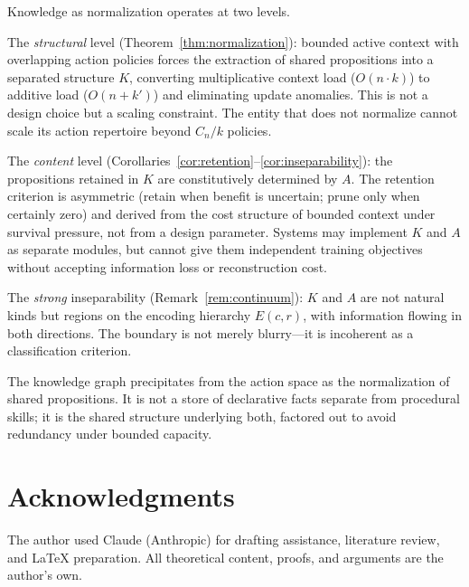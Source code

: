 \documentclass[11pt]{article}
\theoremstyle{definition}
\theoremstyle{remark}
\begin{document}
Knowledge as normalization operates at two levels.

The \emph{structural} level (Theorem~\ref{thm:normalization}):
bounded active context with overlapping action policies forces the
extraction of shared propositions into a separated structure $K$,
converting multiplicative context load ($O(n \cdot k)$) to additive
load ($O(n + k')$) and eliminating update anomalies. This is not a
design choice but a scaling constraint. The entity that does not
normalize cannot scale its action repertoire beyond $C_n / k$ policies.

The \emph{content} level (Corollaries~\ref{cor:retention}--\ref{cor:inseparability}):
the propositions retained in $K$ are constitutively determined by
$A$. The retention criterion is asymmetric (retain when benefit is
uncertain; prune only when certainly zero) and derived from the cost
structure of bounded context under survival pressure, not from a
design parameter. Systems may implement $K$ and $A$ as separate
modules, but cannot give them independent training objectives without
accepting information loss or reconstruction cost.

The \emph{strong} inseparability (Remark~\ref{rem:continuum}): $K$
and $A$ are not natural kinds but regions on the encoding hierarchy
$E(c,r)$, with information flowing in both directions. The boundary
is not merely blurry---it is incoherent as a classification criterion.

The knowledge graph precipitates from the action space as the
normalization of shared propositions. It is not a store of declarative
facts separate from procedural skills; it is the shared structure
underlying both, factored out to avoid redundancy under bounded
capacity.

\section*{Acknowledgments}

The author used Claude (Anthropic) for drafting assistance, literature review, and \LaTeX{} preparation. All theoretical content, proofs, and arguments are the author's own.
\end{document}
